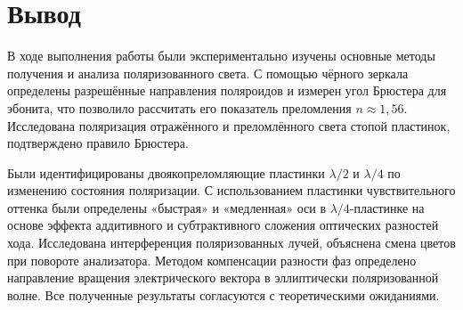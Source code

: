 \documentclass[12pt]{article}
\begin{document}
\section*{Вывод}
В ходе выполнения работы были экспериментально изучены основные методы получения и анализа поляризованного света. С помощью чёрного зеркала определены разрешённые направления поляроидов и измерен угол Брюстера для эбонита, что позволило рассчитать его показатель преломления $n \approx 1,56$. Исследована поляризация отражённого и преломлённого света стопой пластинок, подтверждено правило Брюстера. 

Были идентифицированы двоякопреломляющие пластинки $\lambda/2$ и $\lambda/4$ по изменению состояния поляризации. С использованием пластинки чувствительного оттенка были определены «быстрая» и «медленная» оси в $\lambda/4$-пластинке на основе эффекта аддитивного и субтрактивного сложения оптических разностей хода.
Исследована интерференция поляризованных лучей, объяснена смена цветов при повороте анализатора. Методом компенсации разности фаз определено направление вращения электрического вектора в эллиптически поляризованной волне. Все полученные результаты согласуются с теоретическими ожиданиями.
\end{document}
